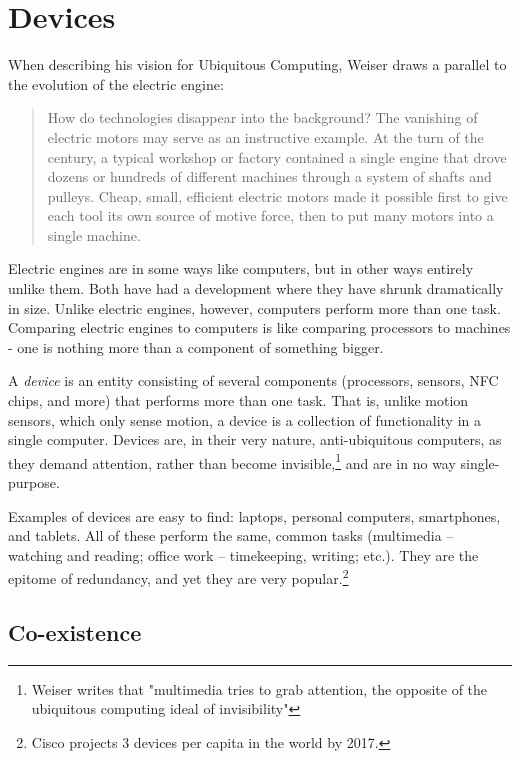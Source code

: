 \section{Devices}

When describing his vision for Ubiquitous Computing, Weiser draws a parallel to the evolution of the electric engine:

\begin{quote}
    How do technologies disappear into the background? The vanishing of electric motors may serve as an instructive example.
    At the turn of the century, a typical workshop or factory contained a single engine that drove dozens or hundreds of
    different machines through a system of shafts and pulleys. Cheap, small, efficient electric motors made it possible first
    to give each tool its own source of motive force, then to put many motors into a single machine.\cite{weiser91}
\end{quote}

Electric engines are in some ways like computers, but in other ways entirely unlike them. Both have had a development where
they have shrunk dramatically in size. Unlike electric engines, however, computers perform more than one task. Comparing electric
engines to computers is like comparing processors to machines - one is nothing more than a component of something bigger.

A \emph{device} is an entity consisting of several components (processors, sensors, NFC chips, and more) that performs more
than one task. That is, unlike motion sensors, which only sense motion, a device is a collection of functionality in a single
computer. Devices are, in their very nature, anti-ubiquitous computers, as they demand attention, rather than become
invisible,\footnote{Weiser writes that "multimedia tries to grab attention, the opposite of the ubiquitous computing ideal of
invisibility"\cite{weiser93}} and are in no way single-purpose.

Examples of devices are easy to find: laptops, personal computers, smartphones, and tablets. All of these perform the same, common
tasks (multimedia -- watching and reading; office work -- timekeeping, writing; etc.). They are the epitome of redundancy, and yet
they are very popular.\footnote{Cisco projects 3 devices per capita in the world by 2017.\cite{cisco}}

\subsection{Co-existence}

